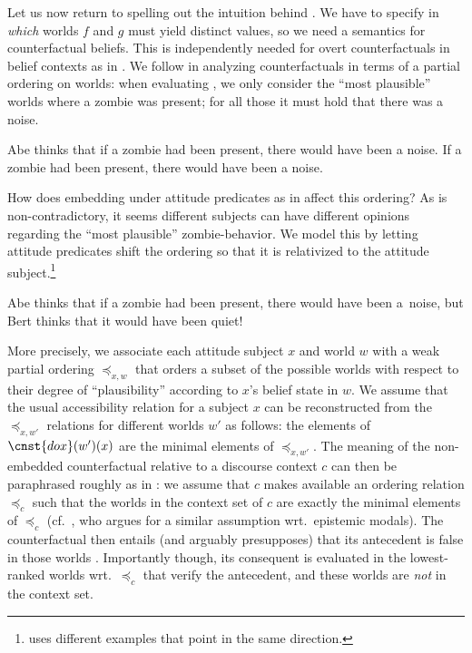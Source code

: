 \documentclass[output=paper]{langscibook}
\begin{document}
\noindent Let us now return to spelling out the intuition behind . We have to specify in \textit{which} worlds $f$ and $g$ must yield distinct values, so we need a semantics for counterfactual beliefs. This is independently needed for overt counterfactuals in belief contexts as in . We follow \citet{Lewis:1973} in analyzing counterfactuals in terms of a partial ordering on worlds: when evaluating , we only consider the ``most plausible''  worlds where a zombie was present; for all those it must hold that there was a noise.

\eanoraggedright
\eanoraggedright \label{sch-has:ex:38} Abe thinks that if a zombie had been present, there would have been a noise. 
\ex \label{sch-has:ex:39} If a zombie had been present, there would have been a noise. \z\z

\noindent How does embedding under attitude predicates as in  affect this ordering?  As  is non-contradictory, it seems different subjects can have different opinions regarding the ``most plausible'' zombie-behavior. We model this by letting attitude predicates shift the ordering so that it is relativized to the attitude subject.\footnote{\citet{Arregui:2008} uses different examples that point in the same direction.}

\eanoraggedright \label{sch-has:ex:40} Abe thinks that if a zombie had been present, there would have been a~noise, but Bert thinks that it would have been quiet!\z

\noindent More precisely, we associate each attitude subject $x$ and world $w$ with a weak partial ordering $\preceq_{x, w}$ that orders a subset of the possible worlds with respect to their degree of ``plausibility'' according to $x$'s belief state in $w$. We assume that the usual accessibility relation for a subject $x$ can be reconstructed from the $\preceq_{x, w'}$ relations for different worlds $w'$ as follows: the elements of $\cnst{dox}(w')(x)$ are the minimal elements of $\preceq_{x, w'}$. The meaning of the non-embedded counterfactual  relative to a discourse context $c$ can then be paraphrased roughly as in : we assume that $c$ makes available an ordering relation $\preceq_c$ such that the worlds in the context set of $c$ are exactly the minimal elements of $\preceq_c$ (cf.~\citealt{Yalcin:2007}, who argues for a similar assumption wrt.~epistemic modals). The counterfactual then entails (and arguably presupposes) that its antecedent is false in those worlds . Importantly though, its consequent is evaluated in the lowest-ranked worlds wrt.~$\preceq_c$ that verify the antecedent, and these worlds are \textit{not} in the context set. 
\end{document}
